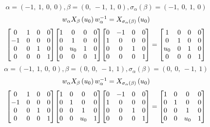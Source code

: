 \documentclass[11pt]{article}
\theoremstyle{definition}
\begin{document}
\[
\alpha = \left( -1, \  1, \  0, \  0\right), \beta = \left( 0, \  -1, \  1, \  0\right), \sigma_{\alpha}(\beta) = \left( -1, \  0, \  1, \  0\right)
\]
\[
\scaletoalign{\textwidth}{w_{\alpha} X_{\beta}\left(u_{0}\right) w_{\alpha}^{-1} = X_{\sigma_{\alpha}\left(\beta\right)}\left(u_{0}\right)}
\]
\[
\scaletoalign{\textwidth}{{\left[\begin{matrix}0 & 1 & 0 & 0\\-1 & 0 & 0 & 0\\0 & 0 & 1 & 0\\0 & 0 & 0 & 1\end{matrix}\right]} {\left[\begin{matrix}1 & 0 & 0 & 0\\0 & 1 & 0 & 0\\0 & u_{0} & 1 & 0\\0 & 0 & 0 & 1\end{matrix}\right]} {\left[\begin{matrix}0 & -1 & 0 & 0\\1 & 0 & 0 & 0\\0 & 0 & 1 & 0\\0 & 0 & 0 & 1\end{matrix}\right]} = {\left[\begin{matrix}1 & 0 & 0 & 0\\0 & 1 & 0 & 0\\u_{0} & 0 & 1 & 0\\0 & 0 & 0 & 1\end{matrix}\right]}}
\]
\[
\alpha = \left( -1, \  1, \  0, \  0\right), \beta = \left( 0, \  0, \  -1, \  1\right), \sigma_{\alpha}(\beta) = \left( 0, \  0, \  -1, \  1\right)
\]
\[
\scaletoalign{\textwidth}{w_{\alpha} X_{\beta}\left(u_{0}\right) w_{\alpha}^{-1} = X_{\sigma_{\alpha}\left(\beta\right)}\left(u_{0}\right)}
\]
\[
\scaletoalign{\textwidth}{{\left[\begin{matrix}0 & 1 & 0 & 0\\-1 & 0 & 0 & 0\\0 & 0 & 1 & 0\\0 & 0 & 0 & 1\end{matrix}\right]} {\left[\begin{matrix}1 & 0 & 0 & 0\\0 & 1 & 0 & 0\\0 & 0 & 1 & 0\\0 & 0 & u_{0} & 1\end{matrix}\right]} {\left[\begin{matrix}0 & -1 & 0 & 0\\1 & 0 & 0 & 0\\0 & 0 & 1 & 0\\0 & 0 & 0 & 1\end{matrix}\right]} = {\left[\begin{matrix}1 & 0 & 0 & 0\\0 & 1 & 0 & 0\\0 & 0 & 1 & 0\\0 & 0 & u_{0} & 1\end{matrix}\right]}}
\]
\end{document}
